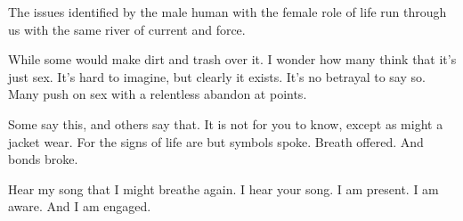 

The issues identified by the male human with the female role of life
run through us with the same river of current and force.  

While some would make dirt and trash over it.  I wonder how many think
that it's just sex.  It's hard to imagine, but clearly it exists.
It's no betrayal to say so.  Many push on sex with a relentless
abandon at points.

Some say this, and others say that.  It is not for you to know, except
as might a jacket wear.  For the signs of life are but symbols spoke.
Breath offered.  And bonds broke.

Hear my song that I might breathe again.  I hear your song.  I am
present.  I am aware.  And I am engaged.

\bye
